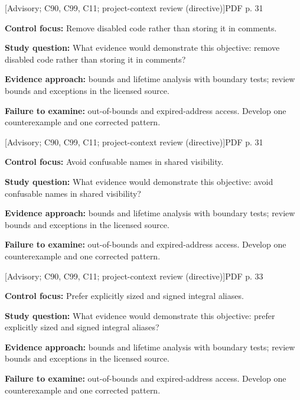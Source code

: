 \documentclass[10pt,letterpaper]{article}
\begin{document}
\smallskip
{}
 \textsf{\footnotesize [Advisory; C90, C99, C11; project-context review (directive)]}\hfill{\footnotesize PDF p. 31}\par
\textbf{Control focus:} Remove disabled code rather than storing it in comments.\par
\textbf{Study question:} What evidence would demonstrate this objective: remove disabled code rather than storing it in comments?\par
\textbf{Evidence approach:} bounds and lifetime analysis with boundary tests; review bounds and exceptions in the licensed source.\par
\textbf{Failure to examine:} out-of-bounds and expired-address access. Develop one counterexample and one corrected pattern.\par
\smallskip
{}
 \textsf{\footnotesize [Advisory; C90, C99, C11; project-context review (directive)]}\hfill{\footnotesize PDF p. 31}\par
\textbf{Control focus:} Avoid confusable names in shared visibility.\par
\textbf{Study question:} What evidence would demonstrate this objective: avoid confusable names in shared visibility?\par
\textbf{Evidence approach:} bounds and lifetime analysis with boundary tests; review bounds and exceptions in the licensed source.\par
\textbf{Failure to examine:} out-of-bounds and expired-address access. Develop one counterexample and one corrected pattern.\par
\smallskip
{}
 \textsf{\footnotesize [Advisory; C90, C99, C11; project-context review (directive)]}\hfill{\footnotesize PDF p. 33}\par
\textbf{Control focus:} Prefer explicitly sized and signed integral aliases.\par
\textbf{Study question:} What evidence would demonstrate this objective: prefer explicitly sized and signed integral aliases?\par
\textbf{Evidence approach:} bounds and lifetime analysis with boundary tests; review bounds and exceptions in the licensed source.\par
\textbf{Failure to examine:} out-of-bounds and expired-address access. Develop one counterexample and one corrected pattern.\par
\end{document}

